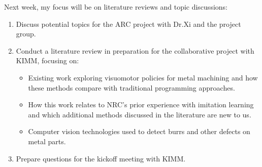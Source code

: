 \documentclass[11pt]{article}
\begin{document}
Next week, my focus will be on literature reviews and topic discussions:

\begin{enumerate}
    \item Discuss potential topics for the ARC project with Dr.Xi and the project group.
    
    \item Conduct a literature review in preparation for the collaborative project with KIMM, focusing on:
    \begin{itemize}
        \item Existing work exploring visuomotor policies for metal machining and how these methods compare with traditional programming approaches.
        \item How this work relates to NRC's prior experience with imitation learning and which additional methods discussed in the literature are new to us.
        \item Computer vision technologies used to detect burrs and other defects on metal parts.
    \end{itemize}
    
    \item Prepare questions for the kickoff meeting with KIMM.
\end{enumerate}
\end{document}
